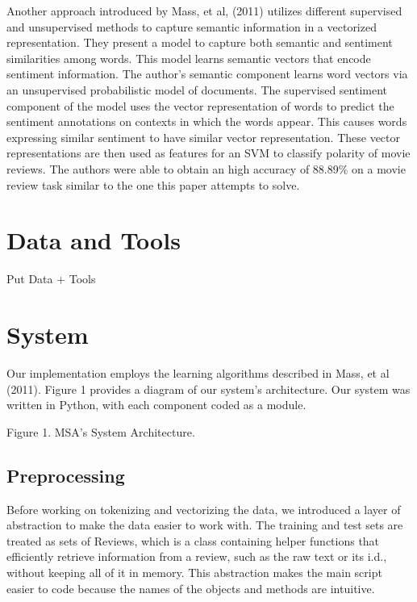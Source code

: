 \documentclass[11pt,letterpaper]{article}
\begin{document}
Another approach introduced by Mass, et al, (2011) utilizes different supervised and unsupervised methods to capture semantic information in a vectorized representation. They present a model to capture both semantic and sentiment similarities among words. This model learns semantic vectors that encode sentiment information. The author’s semantic component learns word vectors via an unsupervised probabilistic model of documents. The supervised  sentiment component of the model uses the vector representation of words to predict the sentiment annotations on contexts in which the words appear. This causes words expressing  similar sentiment to have similar vector representation. These vector representations are then used as features for an SVM to classify polarity of movie reviews. The authors were able to obtain an high accuracy of 88.89\% on a movie review task similar to the one this paper attempts to solve.

\section{Data and Tools}

Put Data + Tools

\section{System}

Our implementation employs the learning algorithms described in Mass, et al (2011). Figure 1 provides a diagram of our system’s architecture. Our system was written in Python, with each component coded as a module.


Figure 1. MSA’s System Architecture.

\subsection{Preprocessing}

Before working on tokenizing and vectorizing the data, we introduced a layer of abstraction to make the data easier to work with. The training and test sets are treated as sets of Reviews, which is a class containing helper functions that efficiently retrieve information from a review, such as the raw text or its i.d., without keeping all of it in memory. This abstraction makes the main script easier to code because the names of the objects and methods are intuitive.
\end{document}
